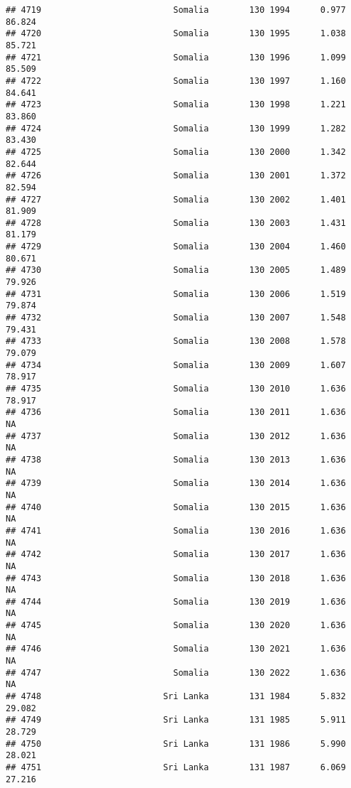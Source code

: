 \documentclass[
]{article}
\begin{document}
\begin{verbatim}
## 4719                          Somalia        130 1994      0.977     86.824
## 4720                          Somalia        130 1995      1.038     85.721
## 4721                          Somalia        130 1996      1.099     85.509
## 4722                          Somalia        130 1997      1.160     84.641
## 4723                          Somalia        130 1998      1.221     83.860
## 4724                          Somalia        130 1999      1.282     83.430
## 4725                          Somalia        130 2000      1.342     82.644
## 4726                          Somalia        130 2001      1.372     82.594
## 4727                          Somalia        130 2002      1.401     81.909
## 4728                          Somalia        130 2003      1.431     81.179
## 4729                          Somalia        130 2004      1.460     80.671
## 4730                          Somalia        130 2005      1.489     79.926
## 4731                          Somalia        130 2006      1.519     79.874
## 4732                          Somalia        130 2007      1.548     79.431
## 4733                          Somalia        130 2008      1.578     79.079
## 4734                          Somalia        130 2009      1.607     78.917
## 4735                          Somalia        130 2010      1.636     78.917
## 4736                          Somalia        130 2011      1.636         NA
## 4737                          Somalia        130 2012      1.636         NA
## 4738                          Somalia        130 2013      1.636         NA
## 4739                          Somalia        130 2014      1.636         NA
## 4740                          Somalia        130 2015      1.636         NA
## 4741                          Somalia        130 2016      1.636         NA
## 4742                          Somalia        130 2017      1.636         NA
## 4743                          Somalia        130 2018      1.636         NA
## 4744                          Somalia        130 2019      1.636         NA
## 4745                          Somalia        130 2020      1.636         NA
## 4746                          Somalia        130 2021      1.636         NA
## 4747                          Somalia        130 2022      1.636         NA
## 4748                        Sri Lanka        131 1984      5.832     29.082
## 4749                        Sri Lanka        131 1985      5.911     28.729
## 4750                        Sri Lanka        131 1986      5.990     28.021
## 4751                        Sri Lanka        131 1987      6.069     27.216

\end{verbatim}
\end{document}
